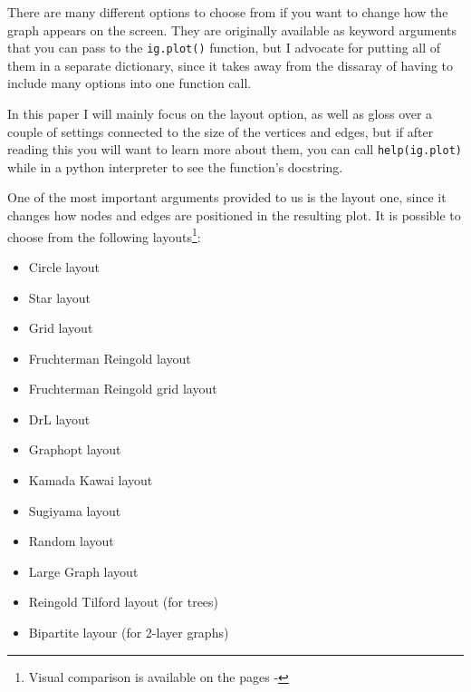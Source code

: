 \documentclass[12pt, a4paper]{article}
\begin{document}
\bgroup
  \inputminted[linenos, breaklines=true, fontsize=\scriptsize]{python}{src/youtube/hdg/1_selecting.py}
  \label{listing:iplot_1sel}
\egroup


There are many different options to choose from if you want to change how the graph appears on the screen. They are originally available as keyword arguments that you can pass to the \texttt{ig.plot()} function, but I advocate for putting all of them in a separate dictionary, since it takes away from the dissaray of having to include many options into one function call.

In this paper I will mainly focus on the layout option, as well as gloss over a couple of settings connected to the size of the vertices and edges, but if after reading this you will want to learn more about them, you can call \texttt{help(ig.plot)} while in a python interpreter to see the function's docstring.

One of the most important arguments provided to us is the layout one, since it changes how nodes and edges are positioned in the resulting plot. It is possible to choose from the following layouts\footnote{Visual comparison is available on the pages \pageref{fig:hdg_c1}-\pageref{fig:hdg_c9}}:

\begin{multicols}{2}
  \begin{itemize}
  \item Circle layout
  \item Star layout
  \item Grid layout
  \item Fruchterman Reingold layout \cite{yt_layout_fg}
  \item Fruchterman Reingold grid layout
  \item DrL layout \cite{yt_layout_dl}
  \item Graphopt layout \cite{yt_layout_graphopt}
  \item Kamada Kawai layout \cite{yt_layout_kk}
  \item Sugiyama layout \cite{yt_layout_sg}
  \item Random layout
  \item Large Graph layout
  \item Reingold Tilford layout (for trees) \cite{yt_layout_ft}
  \item Bipartite layour (for 2-layer graphs)
  \end{itemize}
\end{multicols}
\end{document}
